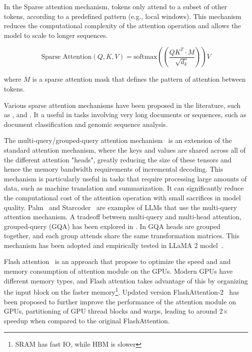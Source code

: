 In the Sparse attention mechanism, tokens only attend to a subset of other tokens, according to a predefined pattern (e.g., local windows).
This mechanism reduces the computational complexity of the attention operation and allows the model to scale to longer sequences.

\begin{equation}
	\text{Sparse Attention}(Q, K, V) = \text{softmax}((\frac{QK^T \cdotp M}{\sqrt{d_k}}))V
	\label{eq:sparse-attention}
\end{equation}

\noindent where \(M\) is a sparse attention mask that defines the pattern of attention between tokens.

Various sparse attention mechanisms have been proposed in the literature, such as \textcite{peng2021random}, \textcite{zaheer2020big} and \textcite{child2019generating}.
It a useful in tasks involving very long documents or sequences, such as document classification and genomic sequence analysis.

The multi-query/grouped-query attention mechanism~\cite{shazeer2019fast} is an extension of the standard attention mechanism, where the keys and values are shared across all of the different attention "heads", greatly reducing the size of these tensors and hence the memory bandwidth requirements of incremental decoding.
This mechanism is particularly useful in tasks that require processing large amounts of data, such as machine translation and summarization.
It can significantly reduce the computational cost of the attention operation with small sacrifices in model quality.
Palm~\cite{chowdhery2022palm} and Starcoder~\cite{li2023starcoder} are examples of LLMs that use the multi-query attention mechanism.
A tradeoff between multi-query and multi-head attention, grouped-query (GQA) has been explored in \textcite{ainslie2023gqa}.
In GQA heads are grouped together, and each group attends share the same transformation matrices.
This mechanism has been adopted and empirically tested in LLaMA 2 model~\cite{touvron2023llama2}.

Flash attention~\cite{dao2022flashattention} is an approach that propose to optimize the speed and and memory consumption of attention module on the GPUs.
Modern GPUs have different memory types, and Flash attention takes advantage of this by organizing the input block on the faster memory\footnote{SRAM has fast IO, while HBM is slower}.
Updated version FlashAttention-2~\cite{liu2022fast} has been proposed to further improve the performance of the attention module on GPUs, partitioning of GPU thread blocks and warps, leading to around 2× speedup when compared to the original FlashAttention.

